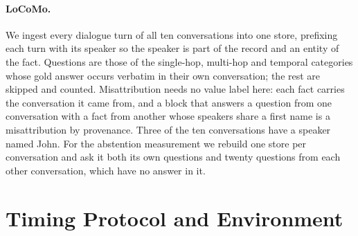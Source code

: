 \documentclass{article} %
\begin{document}
\paragraph{LoCoMo.} We ingest every dialogue turn of all ten conversations into one store, prefixing each turn with its speaker so the speaker is part of the record and an entity of the fact. Questions are those of the single-hop, multi-hop and temporal categories whose gold answer occurs verbatim in their own conversation; the rest are skipped and counted. Misattribution needs no value label here: each fact carries the conversation it came from, and a block that answers a question from one conversation with a fact from another whose speakers share a first name is a misattribution by provenance. Three of the ten conversations have a speaker named John. For the abstention measurement we rebuild one store per conversation and ask it both its own questions and twenty questions from each other conversation, which have no answer in it.
\section{Timing Protocol and Environment}
\label{app:timing}
\end{document}
